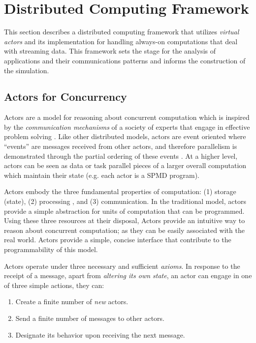 \documentclass[conference,twocolumn,10pt]{IEEEtran}
\begin{document}
\section{Distributed Computing Framework}

This section describes a distributed computing framework that utilizes \textit{virtual actors} and its implementation for handling always-on computations that deal with streaming data. This framework sets the stage for the analysis of applications and their communications patterns and informs the construction of the simulation.

\subsection{Actors for Concurrency}

Actors are a model for reasoning about concurrent computation which is inspired by the \textit{communication mechanisms} of a society of experts that engage in effective problem solving \cite{hewitt_viewing_1977}.  Like other distributed models, actors are event oriented where ``events'' are messages received from other actors, and therefore parallelism is demonstrated through the partial ordering of these events \cite{agha_actors:_1985}. At a higher level, actors can be seen as data or task parallel pieces of a larger overall computation which maintain their state (e.g. each actor is a SPMD program).

Actors embody the three fundamental properties of computation: (1) storage (state), (2) processing , and (3) communication. In the traditional model, actors provide a simple abstraction for units of computation that can be programmed. Using these three resources at their disposal, Actors provide an intuitive way to reason about concurrent computation; as they can be easily associated with the real world. Actors provide a simple, concise interface that contribute to the programmability of this model.

Actors operate under three necessary and sufficient \textit{axioms}. In response to the receipt of a message, apart from \textit{altering its own state}, an actor can engage in one of three simple actions, they can:

\begin{enumerate}
    \item Create a finite number of \textit{new} actors.
    \item Send a finite number of messages to other actors.
    \item Designate its behavior upon receiving the next message.
\end{enumerate}
\end{document}
